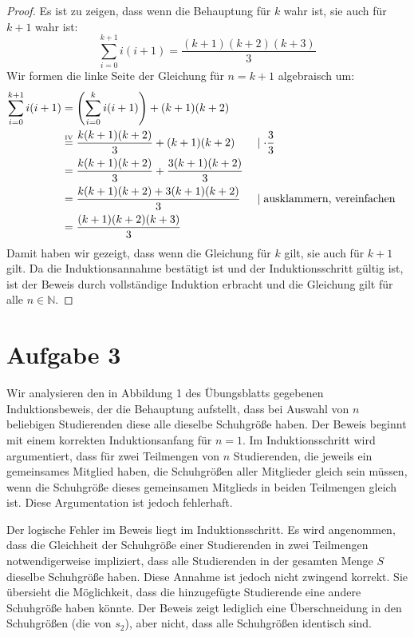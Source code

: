 \documentclass{article}
\begin{document}
\begin{proof}
	Es ist zu zeigen, dass wenn die Behauptung für \( k \) wahr ist, sie auch für \( k + 1 \) wahr ist:
	\[
		\sum_{i=0}^{k+1} i(i + 1) = \frac{(k+1)(k + 2)(k + 3)}{3}
	\]
	Wir formen die linke Seite der Gleichung für \( n = k+1 \) algebraisch um:
	\begin{align*}
		\sum_{i=0}^{k+1} i(i + 1) & = \left(\sum_{i=0}^{k} i(i + 1)\right) + (k+1)(k + 2)                                                                     \\
		                          & \overset{\makebox[0pt]{\tiny{IV}}}{=} \frac{k(k + 1)(k + 2)}{3} + (k+1)(k + 2) &  & \mid \cdot \frac{3}{3}                \\
		                          & = \frac{k(k + 1)(k + 2)}{3} + \frac{3(k+1)(k + 2)}{3}                                                                     \\
		                          & = \frac{k(k + 1)(k + 2) + 3(k+1)(k + 2)}{3}                                    &  & \mid \text{ausklammern, vereinfachen} \\
		                          & = \frac{(k+1)(k + 2)(k + 3)}{3}
	\end{align*}
	Damit haben wir gezeigt, dass wenn die Gleichung für \( k \) gilt, sie auch für \( k+1 \) gilt. Da die Induktionsannahme bestätigt ist und der Induktionsschritt gültig ist, ist der Beweis durch vollständige Induktion erbracht und die Gleichung gilt für alle \( n \in \mathbb{N} \).
\end{proof}

\section*{Aufgabe 3}

Wir analysieren den in Abbildung 1 des Übungsblatts gegebenen Induktionsbeweis, der die Behauptung aufstellt, dass bei Auswahl von \( n \) beliebigen Studierenden diese alle dieselbe Schuhgröße haben. Der Beweis beginnt mit einem korrekten Induktionsanfang für \( n = 1 \). Im Induktionsschritt wird argumentiert, dass für zwei Teilmengen von \( n \) Studierenden, die jeweils ein gemeinsames Mitglied haben, die Schuhgrößen aller Mitglieder gleich sein müssen, wenn die Schuhgröße dieses gemeinsamen Mitglieds in beiden Teilmengen gleich ist. Diese Argumentation ist jedoch fehlerhaft.

Der logische Fehler im Beweis liegt im Induktionsschritt. Es wird angenommen, dass die Gleichheit der Schuhgröße einer Studierenden in zwei Teilmengen notwendigerweise impliziert, dass alle Studierenden in der gesamten Menge \( S \) dieselbe Schuhgröße haben. Diese Annahme ist jedoch nicht zwingend korrekt. Sie übersieht die Möglichkeit, dass die hinzugefügte Studierende eine andere Schuhgröße haben könnte. Der Beweis zeigt lediglich eine Überschneidung in den Schuhgrößen (die von \( s_2 \)), aber nicht, dass alle Schuhgrößen identisch sind.
\end{document}
